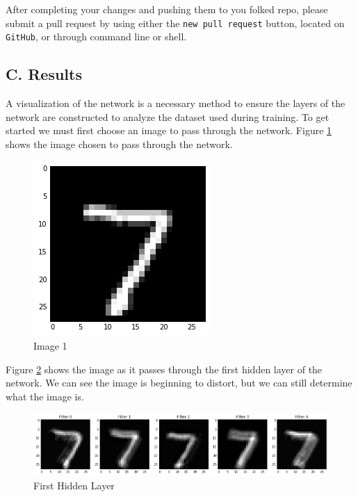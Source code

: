 \documentclass[conference,final,]{IEEEtran}
\begin{document}
After completing your changes and pushing them to you folked repo,
please submit a pull request by using either the
\texttt{new\ pull\ request} button, located on \texttt{GitHub}, or
through command line or shell.

\subsection{C. Results}\label{c.-results}

A visualization of the network is a necessary method to ensure the
layers of the network are constructed to analyze the dataset used during
training. To get started we must first choose an image to pass through
the network. Figure \ref{fig:image-1} shows the image chosen to pass
through the network.

\begin{figure}
  \includegraphics[width=\linewidth]{../images/image-1.png}
  \caption{Image 1}
  \label{fig:image-1}
\end{figure}

Figure \ref{fig:hl1} shows the image as it passes through the first
hidden layer of the network. We can see the image is beginning to
distort, but we can still determine what the image is.

\begin{figure}
  \includegraphics[width=\linewidth]{../images/hl1.png}
  \caption{First Hidden Layer}
  \label{fig:hl1}
\end{figure}
\end{document}

